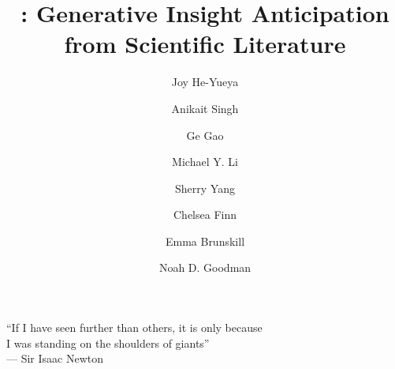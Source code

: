 \documentclass[11pt, letterpaper]{arxiv}
\title{\methodname{} : Generative Insight Anticipation from Scientific Literature}
\author[*1]{Joy He-Yueya}
\author[*1]{Anikait Singh}
\author[1]{Ge Gao}
\author[1]{Michael Y. Li}
\author[2]{Sherry Yang}
\author[1]{Chelsea Finn}
\author[1]{Emma Brunskill}
\author[1]{Noah D. Goodman}
\affil[1]{Stanford University}
\affil[2]{New York University}
\affil[*]{Equal contribution}
\theoremstyle{plain}
\theoremstyle{definition}
\theoremstyle{remark}
\begin{document}
\maketitle



\begin{flushright}
``If I have seen further than others, it is only because \\ I was standing on the shoulders of giants'' \\--- Sir Isaac Newton
\end{flushright}












\clearpage



\newpage
\appendix
\onecolumn


\end{document}
